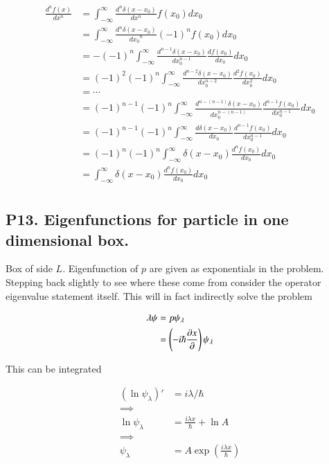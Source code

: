 \documentclass{article}
\newcommand{\IIinf}[0]{ \int_{-\infty}^\infty }
\begin{document}
\begin{align*}
\frac{d^n f(x)}{dx^n} 
&= \IIinf \frac{d^n \delta(x - x_0)}{dx^n} f(x_0) dx_0 \\
&= \IIinf \frac{d^n \delta(x-x_0)}{{dx_0}^n} (-1)^n f(x_0) dx_0 \\
&= -(-1)^n \int_{-\infty}^{\infty} \frac{d^{n-1} \delta(x - x_0)}{dx_0^{n-1}} \frac{df(x_0)}{dx_0} dx_0 \\
&= (-1)^2 (-1)^n \int_{-\infty}^{\infty} \frac{d^{n-2} \delta(x - x_0)}{dx_0^{n-2}} \frac{d^2 f(x_0)}{dx_0^2} dx_0 \\
&= \cdots \\
&= (-1)^{n-1} (-1)^n \int_{-\infty}^{\infty} \frac{d^{n-(n-1)} \delta(x - x_0)}{dx_0^{n-(n-1)}} \frac{d^{n-1} f(x_0)}{dx_0^{n-1}} dx_0 \\
&= (-1)^{n-1} (-1)^n \int_{-\infty}^{\infty} \frac{d \delta(x - x_0)}{dx_0} \frac{d^{n-1} f(x_0)}{dx_0^{n-1}} dx_0 \\
&= (-1)^n (-1)^n \int_{-\infty}^{\infty} \delta(x - x_0) \frac{d^n f(x_0)}{dx_0} dx_0 \\
&= \int_{-\infty}^{\infty} \delta(x - x_0) \frac{d^n f(x_0)}{dx_0} dx_0 \\
\end{align*}

\subsection{ P13. Eigenfunctions for particle in one dimensional box. }

Box of side $L$.  Eigenfunction of $p$ are given as exponentials in the problem.  Stepping back slightly to see where these come from 
consider the operator eigenvalue statement itself.  This will in fact indirectly solve the problem

\begin{align*}
\lambda \psi 
&= p \psi_\lambda \\
&= \left(-i \hbar \frac{\partial{x}}{\partial {}} \right) \psi_\lambda \\
\end{align*}

This can be integrated

\begin{align*}
(\ln \psi_\lambda)' &= i \lambda/\hbar \\
\implies \\
\ln \psi_\lambda &= \frac{i \lambda x }{\hbar} + \ln A \\
\implies \\
\psi_\lambda &= A \exp\left( \frac{i \lambda x }{\hbar} \right) \\
\end{align*}
\end{document}
